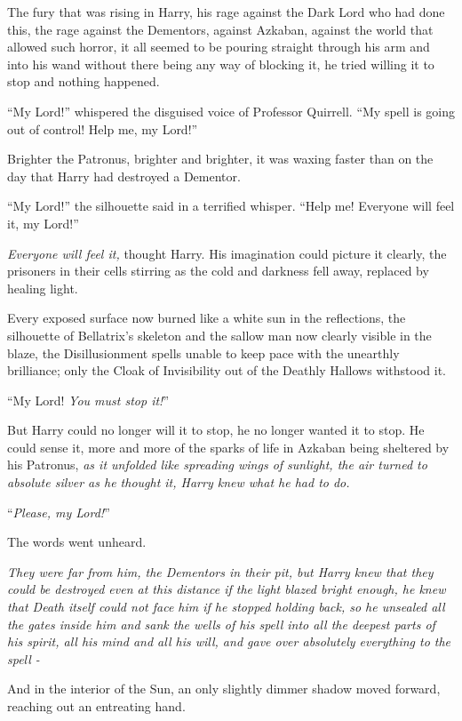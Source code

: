 The fury that was rising in Harry, his rage against the Dark Lord who had done this, the rage against the Dementors, against Azkaban, against the world that allowed such horror, it all seemed to be pouring straight through his arm and into his wand without there being any way of blocking it, he tried willing it to stop and nothing happened.

``My Lord!'' whispered the disguised voice of Professor Quirrell. ``My spell is going out of control! Help me, my Lord!''

Brighter the Patronus, brighter and brighter, it was waxing faster than on the day that Harry had destroyed a Dementor.

``My Lord!'' the silhouette said in a terrified whisper. ``Help me! Everyone will feel it, my Lord!''

\emph{Everyone will feel it,} thought Harry. His imagination could picture it clearly, the prisoners in their cells stirring as the cold and darkness fell away, replaced by healing light.

Every exposed surface now burned like a white sun in the reflections, the silhouette of Bellatrix's skeleton and the sallow man now clearly visible in the blaze, the Disillusionment spells unable to keep pace with the unearthly brilliance; only the Cloak of Invisibility out of the Deathly Hallows withstood it.

``My Lord! \emph{You must stop it!}''

But Harry could no longer will it to stop, he no longer wanted it to stop. He could sense it, more and more of the sparks of life in Azkaban being sheltered by his Patronus, \emph{as it unfolded like spreading wings of sunlight, the air turned to absolute silver as he thought it, Harry knew what he had to do.}

``\emph{Please, my Lord!}''

The words went unheard.

\emph{They were far from him, the Dementors in their pit, but Harry knew that they could be destroyed even at this distance if the light blazed bright enough, he knew that Death itself could not face him if he stopped holding back, so he unsealed all the gates inside him and sank the wells of his spell into all the deepest parts of his spirit, all his mind and all his will, and gave over absolutely everything to the spell -}

And in the interior of the Sun, an only slightly dimmer shadow moved forward, reaching out an entreating hand.

